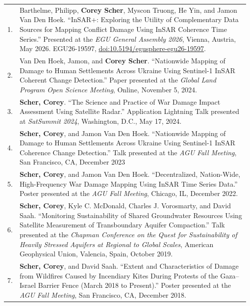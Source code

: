 \documentclass[letterpaper,11pt,oneside]{article}
\begin{document}
\begin{longtable}{@{}p{0.03\linewidth}p{0.95\linewidth}@{}}

1. & Barthelme, Philipp, \textbf{Corey Scher}, Myscon Truong, He Yin, and Jamon Van Den Hoek. “InSAR+: Exploring the Utility of Complementary Data Sources for Mapping Conflict Damage Using InSAR Coherence Time Series.” Presented at the \textit{EGU General Assembly 2026}, Vienna, Austria, May 2026. EGU26-19597, \href{https://doi.org/10.5194/egusphere-egu26-19597}{doi:10.5194/egusphere-egu26-19597}.\\[1.0ex]

2. & Van Den Hoek, Jamon, and \textbf{Corey Scher}. “Nationwide Mapping of Damage to Human Settlements Across Ukraine Using Sentinel-1 InSAR Coherent Change Detection.” Paper presented at the \textit{Global Land Program Open Science Meeting}, Online, November 5, 2024.\\[1.0ex]

3. & \textbf{Scher, Corey}. “The Science and Practice of War Damage Impact Assessment Using Satellite Radar.” Application Lightning Talk presented at \textit{SatSummit 2024}, Washington, D.C., May 17, 2024.\\[1.0ex]

4. & \textbf{Scher, Corey}, and Jamon Van Den Hoek. “Nationwide Mapping of Damage to Human Settlements Across Ukraine Using Sentinel-1 InSAR Coherence Change Detection.” Talk presented at the \textit{AGU Fall Meeting}, San Francisco, CA, December 2023\\[1.0ex]

5. & \textbf{Scher, Corey}, and Jamon Van Den Hoek. “Decentralized, Nation-Wide, High-Frequency War Damage Mapping Using InSAR Time Series Data.” Poster presented at the \textit{AGU Fall Meeting}, Chicago, IL, December 2022.\\[1.0ex]

6. & \textbf{Scher, Corey}, Kyle C. McDonald, Charles J. Vorosmarty, and David Saah. “Monitoring Sustainability of Shared Groundwater Resources Using Satellite Measurement of Transboundary Aquifer Compaction.” Talk presented at the \textit{Chapman Conference on the Quest for Sustainability of Heavily Stressed Aquifers at Regional to Global Scales}, American Geophysical Union, Valencia, Spain, October 2019.\\[1.0ex]

7. & \textbf{Scher, Corey}, and David Saah. “Extent and Characteristics of Damage from Wildfires Caused by Incendiary Kites During Protests of the Gaza–Israel Barrier Fence (March 2018 to Present).” Poster presented at the \textit{AGU Fall Meeting}, San Francisco, CA, December 2018.\\[1.0ex]


\end{longtable}
\end{document}
